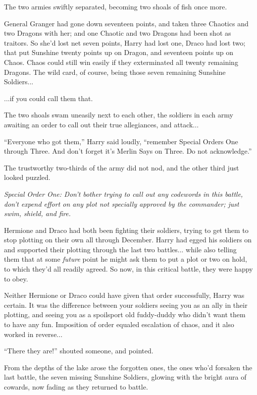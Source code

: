 The two armies swiftly separated, becoming two shoals of fish once more.

General Granger had gone down seventeen points, and taken three Chaotics and two Dragons with her; and one Chaotic and two Dragons had been shot as traitors. So she'd lost net seven points, Harry had lost one, Draco had lost two; that put Sunshine twenty points up on Dragon, and seventeen points up on Chaos. Chaos could still win easily if they exterminated all twenty remaining Dragons. The wild card, of course, being those seven remaining Sunshine Soldiers...

...if you could call them that.

The two shoals swam uneasily next to each other, the soldiers in each army awaiting an order to call out their true allegiances, and attack...

``Everyone who got them,'' Harry said loudly, ``remember Special Orders One through Three. And don't forget it's Merlin Says on Three. Do not acknowledge.''

The trustworthy two-thirds of the army did not nod, and the other third just looked puzzled.

\emph{Special Order One: Don't bother trying to call out any codewords in this battle, don't expend effort on any plot not specially approved by the commander; just swim, shield, and fire.}

Hermione and Draco had both been fighting their soldiers, trying to get them to stop plotting on their own all through December. Harry had egged his soldiers on and supported their plotting through the last two battles... while also telling them that at some \emph{future} point he might ask them to put a plot or two on hold, to which they'd all readily agreed. So now, in this critical battle, they were happy to obey.

Neither Hermione or Draco could have given that order successfully, Harry was certain. It was the difference between your soldiers seeing you as an ally in their plotting, and seeing you as a spoilsport old fuddy-duddy who didn't want them to have any fun. Imposition of order equaled escalation of chaos, and it also worked in reverse...

``There they are!'' shouted someone, and pointed.

From the depths of the lake arose the forgotten ones, the ones who'd forsaken the last battle, the seven missing Sunshine Soldiers, glowing with the bright aura of cowards, now fading as they returned to battle.

